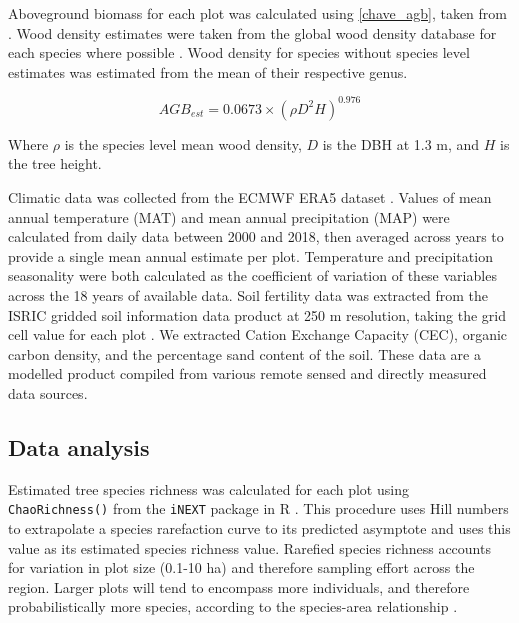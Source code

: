 \documentclass[11pt,a4paper]{article}
\begin{document}
Aboveground biomass for each plot was calculated using \autoref{chave_agb}, taken from \citet{Chave2014}. Wood density estimates were taken from the global wood density database for each species where possible \citep{Chave2009, Zanne2009}. Wood density for species without species level estimates was estimated from the mean of their respective genus. 

\begin{equation}
	AGB_{est} = 0.0673 \times (\rho D^{2} H)^{0.976}
	\label{chave_agb}
\end{equation}

Where $\rho$ is the species level mean wood density, $D$ is the DBH at 1.3 m, and $H$ is the tree height.

Climatic data was collected from the ECMWF ERA5 dataset \citep{}. Values of mean annual temperature (MAT) and mean annual precipitation (MAP) were calculated from daily data between 2000 and 2018, then averaged across years to provide a single mean annual estimate per plot. Temperature and precipitation seasonality were both calculated as the coefficient of variation of these variables across the 18 years of available data. Soil fertility data was extracted from the ISRIC gridded soil information data product at 250 m resolution, taking the grid cell value for each plot \citep{Hengl2017}. We extracted Cation Exchange Capacity (CEC), organic carbon density, and the percentage sand content of the soil. These data are a modelled product compiled from various remote sensed and directly measured data sources. 

% 
% 

\subsection{Data analysis}
Estimated tree species richness was calculated for each plot using \verb|ChaoRichness()| from the \verb|iNEXT| package in R \citep{Hsieh2016}. This procedure uses Hill numbers to extrapolate a species rarefaction curve to its predicted asymptote and uses this value as its estimated species richness value. Rarefied species richness accounts for variation in plot size (0.1-10 ha) and therefore sampling effort across the region. Larger plots will tend to encompass more individuals, and therefore probabilistically more species, according to the species-area relationship \citep{}.
\end{document}
